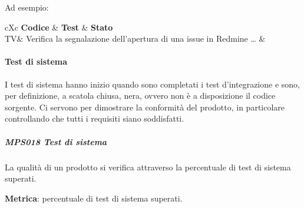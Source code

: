 			Ad esempio:

			\newenvironment{VTtable}[1][1]{%
				\renewcommand*{\arraystretch}{#1}%
				\renewcommand\theadfont{\bfseries}%
				\oldtabularx%
			}{\endoldtabularx}
			\newcommand{\addtotv}{\stepcounter{tv}TV\thetv}
			\begin{table}[H]
				\begin{VTtable}[1.7]{\textwidth}{cXc}
					\rowcolor{\tablegray}
					\textbf{Codice} & \centering\textbf{Test} & \textbf{Stato} \\\toprule
					\addtotv & Verifica la segnalazione dell'apertura di una issue in Redmine \dots
					& \TNI \\
					\bottomrule
				\end{VTtable}
			\end{table}


			\paragraph{Test di sistema} \label{testsistema}
			I test di sistema hanno inizio quando sono completati i test d'integrazione e sono, per definizione, a scatola chiusa, nera, ovvero non è a disposizione il codice sorgente.
			Ci servono per dimostrare la conformità del prodotto, in particolare controllando che tutti i requisiti siano soddisfatti.

            \subparagraph{MPS018 Test di sistema}\label{testsistema:met}
            La qualità di un prodotto si verifica attraverso la percentuale di test di sistema superati.

            \textbf{Metrica}: percentuale di test di sistema superati.

